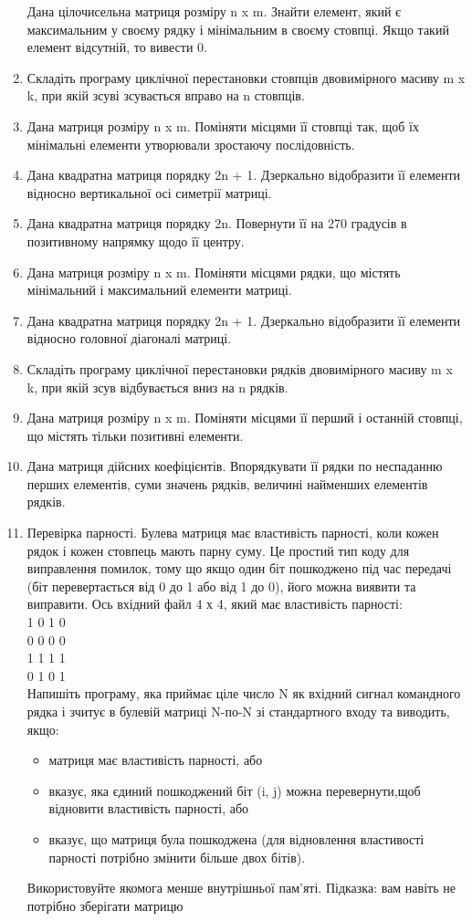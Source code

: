 \documentclass[]{article}
\begin{document}
\begin{enumerate}
Дана цілочисельна матриця розміру n x m. Знайти елемент, який є
максимальним у своєму рядку і мінімальним в своєму стовпці. Якщо такий
елемент відсутній, то вивести 0.
\item
Складіть програму циклічної перестановки стовпців двовимірного масиву m
x k, при якій зсуві зсувається вправо на n стовпців.
\item
Дана матриця розміру n x m. Поміняти місцями її стовпці так, щоб їх
мінімальні елементи утворювали зростаючу послідовність.
\item
Дана квадратна матриця порядку 2n + 1. Дзеркально відобразити її
елементи відносно вертикальної осі симетрії матриці.
\item
Дана квадратна матриця порядку 2n. Повернути її на 270 градусів в
позитивному напрямку щодо її центру.
\item
Дана матриця розміру n x m. Поміняти місцями рядки, що містять
мінімальний і максимальний елементи матриці.
\item
Дана квадратна матриця порядку 2n + 1. Дзеркально відобразити її
елементи відносно головної діагоналі матриці.
\item
Складіть програму циклічної перестановки рядків двовимірного масиву m x
k, при якій зсув відбувається вниз на n рядків.
\item
Дана матриця розміру n x m. Поміняти місцями її перший і останній
стовпці, що містять тільки позитивні елементи.
\item
Дана матриця дійсних коефіцієнтів. Впорядкувати її рядки по неспаданню
перших елементів, суми значень рядків, величині найменших елементів
рядків.


\item Перевірка парності.
Булева матриця має властивість парності, коли кожен рядок і кожен стовпець мають парну суму.
Це простий тип коду для виправлення помилок, тому що якщо один біт пошкоджено під час передачі
 (біт перевертається від 0 до 1 або від 1 до 0), його можна виявити та виправити. Ось вхідний файл 4 х 4, який має властивість парності:\\
1 0 1 0 \\
0 0 0 0 \\
1 1 1 1 \\
0 1 0 1 \\
Напишіть програму, яка приймає ціле число N як вхідний сигнал командного рядка і зчитує в булевій матриці N-по-N зі стандартного входу
та виводить, якщо:
\begin{itemize}
\item матриця має властивість парності, або 
\item вказує, яка єдиний пошкоджений біт (i, j) можна перевернути,щоб відновити властивість парності, або 
\item вказує, що матриця була пошкоджена
(для відновлення властивості парності потрібно змінити більше двох бітів).
\end{itemize}
 Використовуйте якомога менше внутрішньої пам’яті. Підказка: вам навіть не потрібно зберігати матрицю
\end{enumerate}
\end{document}
